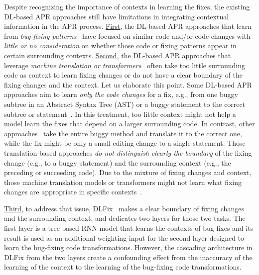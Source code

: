 Despite recognizing the importance of contexts in learning the fixes,
the existing DL-based APR approaches still have limitations in
integrating contextual information in the APR
process. \underline{First}, the DL-based APR approaches that learn
from {\em bug-fixing patterns}~\cite{white2016deep,gupta2017deepfix}
have focused on similar code and/or code changes with {\em little or
  no consideration} on whether those code or fixing patterns appear in
certain surrounding contexts. \underline{Second}, the DL-based APR
approaches that leverage {\em machine translation or
  transformers}~\cite{chakrabortycodit,chen2018sequencer,hata2018learning,tufano2018empirical,see2017get}
often take too little surrounding code as context to learn fixing
changes or do not have a clear boundary of the fixing changes and the
context. Let us elaborate this point. Some DL-based APR approaches aim
to learn {\em only the code changes} for a fix, e.g., from one buggy
subtree in an Abstract Syntax Tree (AST) or a buggy statement to the
correct subtree or statement~\cite{chakrabortycodit}. In this
treatment, too little context might not help a model learn the fixes
that depend on a larger surrounding code. In contrast, other
approaches~\cite{chen2018sequencer,hata2018learning} take the entire
buggy method and translate it to the correct one, while the fix might
be only a small editing change to a single statement. Those
translation-based approaches {\em do not distinguish clearly the
  boundary} of the fixing change (e.g., to a buggy statement) and the
surrounding context (e.g., the preceding or succeeding code). Due to
the mixture of fixing changes and context, those machine translation
models or transformers might not learn what fixing changes are
appropriate in specific contexts~\cite{icse20}.

\underline{Third}, to address that issue, DLFix~\cite{icse20} makes a
clear boundary of fixing changes and the surrounding context, and
dedicates two layers for those two tasks. The first layer is a
tree-based RNN model that learns the contexts of bug fixes and its
result is used as an additional weighting input for the second layer
designed to learn the bug-fixing code transformations. However, the
cascading architecture in DLFix from the two layers create a
confounding effect from the inaccuracy of the learning of the context
to the learning of the bug-fixing code transformations.


